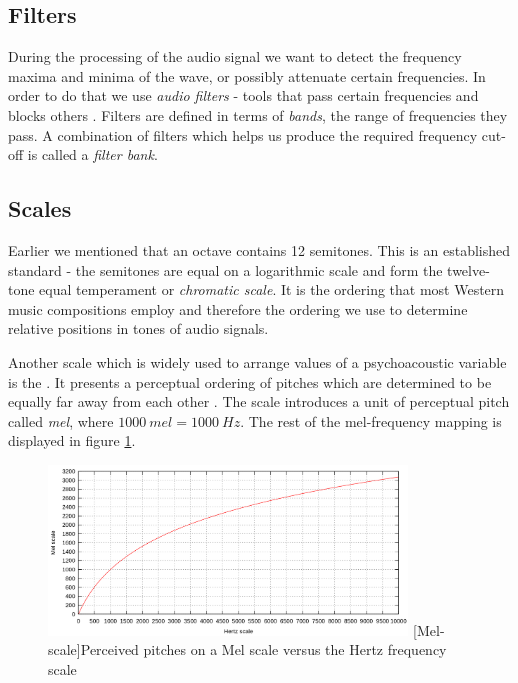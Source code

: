 \subsection{Filters}
\label{subsec:filters}
During the processing of the audio signal we want to detect the frequency maxima
and minima of the wave, or possibly attenuate certain frequencies. In order to
do that we use \textit{audio filters} - tools that pass certain frequencies and
blocks others \cite{filters}. Filters are defined in terms of \textit{bands},
the range of frequencies they pass. A combination of filters which helps us
produce the required frequency cut-off is called a \textit{filter bank}.

\subsection{Scales}
\label{subsec:scales}
Earlier we mentioned that an octave contains 12 semitones. This is an
established standard - the semitones are equal on a logarithmic scale and form
the twelve-tone equal temperament or \textit{chromatic scale}. It is the
ordering that most Western music compositions employ and therefore the ordering
we use to determine relative positions in tones of audio signals.

Another scale which is widely used to arrange values of a psychoacoustic
variable is the . It presents a perceptual ordering of pitches
which are determined to be equally far away from each other
\cite{stevens1937scale}. The scale introduces a unit of perceptual pitch called
\textit{mel}, where $1000\:mel = 1000\:Hz$. The rest of the mel-frequency
mapping is displayed in figure \ref{fig:melscale}.

\begin{figure}[H]
    \centering
    \includegraphics[width=0.85\textwidth]{BackgroundTheory/mel-scale.png}
    [Mel-scale]{Perceived pitches on a Mel scale versus the Hertz frequency scale \cite{wiki:melscale}}
    \label{fig:melscale}
\end{figure}

